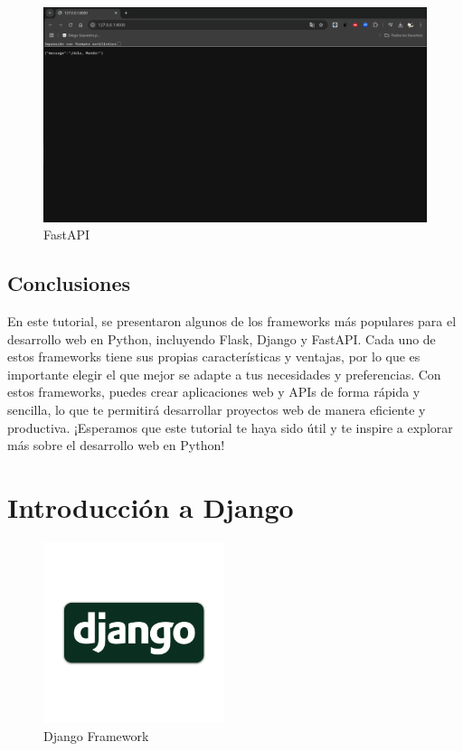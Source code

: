 \documentclass[
  a4paper,
  DIV=11,
  numbers=noendperiod,
  onepage,
  openany]{scrreprt}
\begin{document}
\begin{figure}[H]

{\centering \includegraphics[width=8.33333in,height=\textheight,keepaspectratio]{unidades/unidad7/./images/fastapi_code002.png}

}

\caption{FastAPI}

\end{figure}%

\section{Conclusiones}\label{conclusiones-12}

En este tutorial, se presentaron algunos de los frameworks más populares
para el desarrollo web en Python, incluyendo Flask, Django y FastAPI.
Cada uno de estos frameworks tiene sus propias características y
ventajas, por lo que es importante elegir el que mejor se adapte a tus
necesidades y preferencias. Con estos frameworks, puedes crear
aplicaciones web y APIs de forma rápida y sencilla, lo que te permitirá
desarrollar proyectos web de manera eficiente y productiva. ¡Esperamos
que este tutorial te haya sido útil y te inspire a explorar más sobre el
desarrollo web en Python!

\chapter{Introducción a Django}\label{introducciuxf3n-a-django}

\begin{figure}[H]

{\centering \includegraphics[width=2.08333in,height=\textheight,keepaspectratio]{unidades/unidad7/./images/django_logo.png}

}

\caption{Django Framework}

\end{figure}%
\end{document}
